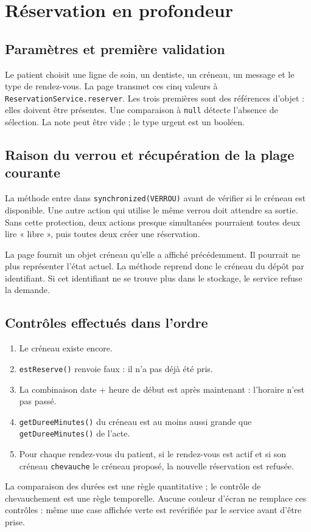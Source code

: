 \documentclass[11pt,a4paper]{report}
\begin{document}
\section{Réservation en profondeur}
\subsection{Paramètres et première validation}
Le patient choisit une ligne de soin, un dentiste, un créneau, un message et le type de rendez-vous. La page transmet ces cinq valeurs à \texttt{ReservationService.reserver}. Les trois premières sont des références d'objet : elles doivent être présentes. Une comparaison à \texttt{null} détecte l'absence de sélection. La note peut être vide ; le type urgent est un booléen.

\subsection{Raison du verrou et récupération de la plage courante}
La méthode entre dans \texttt{synchronized(VERROU)} avant de vérifier si le créneau est disponible. Une autre action qui utilise le même verrou doit attendre sa sortie. Sans cette protection, deux actions presque simultanées pourraient toutes deux lire « libre », puis toutes deux créer une réservation.

La page fournit un objet créneau qu'elle a affiché précédemment. Il pourrait ne plus représenter l'état actuel. La méthode reprend donc le créneau du dépôt par identifiant. Si cet identifiant ne se trouve plus dans le stockage, le service refuse la demande.

\subsection{Contrôles effectués dans l'ordre}
\begin{enumerate}
\item Le créneau existe encore.
\item \texttt{estReserve()} renvoie faux : il n'a pas déjà été pris.
\item La combinaison date + heure de début est après maintenant : l'horaire n'est pas passé.
\item \texttt{getDureeMinutes()} du créneau est au moins aussi grande que \texttt{getDureeMinutes()} de l'acte.
\item Pour chaque rendez-vous du patient, si le rendez-vous est actif et si son créneau \texttt{chevauche} le créneau proposé, la nouvelle réservation est refusée.
\end{enumerate}
La comparaison des durées est une règle quantitative ; le contrôle de chevauchement est une règle temporelle. Aucune couleur d'écran ne remplace ces contrôles : même une case affichée verte est revérifiée par le service avant d'être prise.
\end{document}
